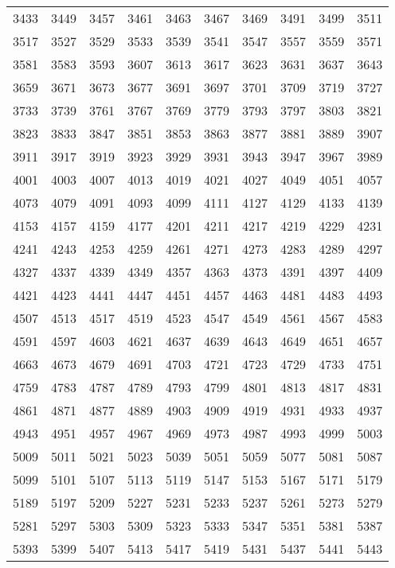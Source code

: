 \documentclass[12pt]{article}
\begin{document}
\begin{tabular}{rrrrrrrrrr}
3433 & 3449 & 3457 & 3461 & 3463 & 3467 & 3469 & 3491 & 3499 & 3511 \\
3517 & 3527 & 3529 & 3533 & 3539 & 3541 & 3547 & 3557 & 3559 & 3571 \\
3581 & 3583 & 3593 & 3607 & 3613 & 3617 & 3623 & 3631 & 3637 & 3643 \\
3659 & 3671 & 3673 & 3677 & 3691 & 3697 & 3701 & 3709 & 3719 & 3727 \\
3733 & 3739 & 3761 & 3767 & 3769 & 3779 & 3793 & 3797 & 3803 & 3821 \\
3823 & 3833 & 3847 & 3851 & 3853 & 3863 & 3877 & 3881 & 3889 & 3907 \\
3911 & 3917 & 3919 & 3923 & 3929 & 3931 & 3943 & 3947 & 3967 & 3989 \\
4001 & 4003 & 4007 & 4013 & 4019 & 4021 & 4027 & 4049 & 4051 & 4057 \\
4073 & 4079 & 4091 & 4093 & 4099 & 4111 & 4127 & 4129 & 4133 & 4139 \\
4153 & 4157 & 4159 & 4177 & 4201 & 4211 & 4217 & 4219 & 4229 & 4231 \\
4241 & 4243 & 4253 & 4259 & 4261 & 4271 & 4273 & 4283 & 4289 & 4297 \\
4327 & 4337 & 4339 & 4349 & 4357 & 4363 & 4373 & 4391 & 4397 & 4409 \\
4421 & 4423 & 4441 & 4447 & 4451 & 4457 & 4463 & 4481 & 4483 & 4493 \\
4507 & 4513 & 4517 & 4519 & 4523 & 4547 & 4549 & 4561 & 4567 & 4583 \\
4591 & 4597 & 4603 & 4621 & 4637 & 4639 & 4643 & 4649 & 4651 & 4657 \\
4663 & 4673 & 4679 & 4691 & 4703 & 4721 & 4723 & 4729 & 4733 & 4751 \\
4759 & 4783 & 4787 & 4789 & 4793 & 4799 & 4801 & 4813 & 4817 & 4831 \\
4861 & 4871 & 4877 & 4889 & 4903 & 4909 & 4919 & 4931 & 4933 & 4937 \\
4943 & 4951 & 4957 & 4967 & 4969 & 4973 & 4987 & 4993 & 4999 & 5003 \\
5009 & 5011 & 5021 & 5023 & 5039 & 5051 & 5059 & 5077 & 5081 & 5087 \\
5099 & 5101 & 5107 & 5113 & 5119 & 5147 & 5153 & 5167 & 5171 & 5179 \\
5189 & 5197 & 5209 & 5227 & 5231 & 5233 & 5237 & 5261 & 5273 & 5279 \\
5281 & 5297 & 5303 & 5309 & 5323 & 5333 & 5347 & 5351 & 5381 & 5387 \\
5393 & 5399 & 5407 & 5413 & 5417 & 5419 & 5431 & 5437 & 5441 & 5443 \\

\end{tabular}
\end{document}
